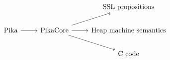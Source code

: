 \[\begin{tikzcd}
	&& {\textnormal{SSL propositions}} \\
	{\textnormal{Pika}} & {\textnormal{PikaCore}} & {\textnormal{Heap machine semantics}} \\
	&& {\textnormal{C code}}
	\arrow[from=2-1, to=2-2]
	\arrow[from=2-2, to=1-3]
	\arrow[from=2-2, to=2-3]
	\arrow[from=2-2, to=3-3]
\end{tikzcd}\]
